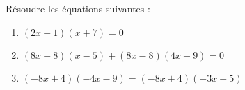 \documentclass[a4paper,11pt,exos]{nsi} %
\begin{document}
\maketitle

\begin{exercice}
    Résoudre les équations suivantes :
        \begin{enumerate}
            \item $(2x-1)(x+7)=0$
            \item $(8x-8)( x-5)+(8x-8)(4x-9)=0$
            \item $(-8x+4)( -4x-9)=(-8x+4)(-3x-5)$
        \end{enumerate}
    
\end{exercice}
\end{document}
